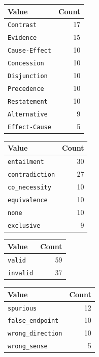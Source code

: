 \documentclass[11pt]{article}
\begin{document}
\begin{minipage}[t]{0.48\linewidth}
\centering
\small
{}
\label{tab:senses}
\begin{tabular}{lr}
\toprule
Value & Count \\
\midrule
\texttt{Contrast} & 17 \\
\texttt{Evidence} & 15 \\
\texttt{Cause-Effect} & 10 \\
\texttt{Concession} & 10 \\
\texttt{Disjunction} & 10 \\
\texttt{Precedence} & 10 \\
\texttt{Restatement} & 10 \\
\texttt{Alternative} & 9 \\
\texttt{Effect-Cause} & 5 \\
\bottomrule
\end{tabular}
\end{minipage}\hfill\begin{minipage}[t]{0.48\linewidth}
\centering
\small
{}
\label{tab:couplings}
\begin{tabular}{lr}
\toprule
Value & Count \\
\midrule
\texttt{entailment} & 30 \\
\texttt{contradiction} & 27 \\
\texttt{co\_necessity} & 10 \\
\texttt{equivalence} & 10 \\
\texttt{none} & 10 \\
\texttt{exclusive} & 9 \\
\bottomrule
\end{tabular}
\end{minipage}

\bigskip
\begin{minipage}[t]{0.48\linewidth}
\centering
\small
{}
\label{tab:validity}
\begin{tabular}{lr}
\toprule
Value & Count \\
\midrule
\texttt{valid} & 59 \\
\texttt{invalid} & 37 \\
\bottomrule
\end{tabular}
\end{minipage}\hfill\begin{minipage}[t]{0.48\linewidth}
\centering
\small
{}
\label{tab:errorkinds}
\begin{tabular}{lr}
\toprule
Value & Count \\
\midrule
\texttt{spurious} & 12 \\
\texttt{false\_endpoint} & 10 \\
\texttt{wrong\_direction} & 10 \\
\texttt{wrong\_sense} & 5 \\
\bottomrule
\end{tabular}
\end{minipage}
\end{document}
